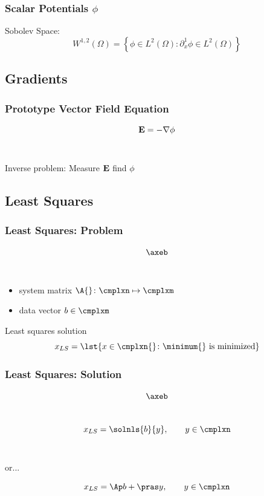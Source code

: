 \documentclass[]{beamer}
\begin{document}
\begin{frame}      %
\frametitle{Scalar Potentials $\phi$}
  Sobolev Space:
$$W^{1,2}\left( \Omega \right) = \left\{ \phi\in L^{2}\left( \Omega \right)\colon \partial_{x}^{1}\phi\in L^{2}\left( \Omega \right) \right\}$$
\end{frame}

\subsection{Gradients}

\begin{frame}      %
\frametitle{Prototype Vector Field Equation}
  $$\bf{E} = - \nabla \phi$$ \\[20pt]
  \onedot
  \pause
  \begin{center}
    Inverse problem: Measure $\bf{E}$ find $\phi$
  \end{center}
  \onedot
\end{frame}

\subsection{Least Squares}

\begin{frame}      %
\frametitle{Least Squares: Problem}
  $$\axeb$$\\[0pt]
  \begin{itemize}
		\item system matrix $\A{}\colon \cmplxn \mapsto \cmplxm$
		\item data vector $b \in \cmplxm$
	\end{itemize}
	Least squares solution
	$$x_{LS} = \lst{ x\in\cmplxn{} \colon \minimum{} \text{ is minimized} }$$
\end{frame}

\begin{frame}      %
\frametitle{Least Squares: Solution}
  $$\axeb$$ \\[10pt]
  \pause
  $$x_{LS} = \solnls{b}{y}, \qquad y\in\cmplxn$$ \\[10pt]
  \begin{center}
     or...
  \end{center}
  $$x_{LS} = \Ap b + \pras y, \qquad y\in\cmplxn$$ \\[10pt]
\end{frame}
\end{document}
